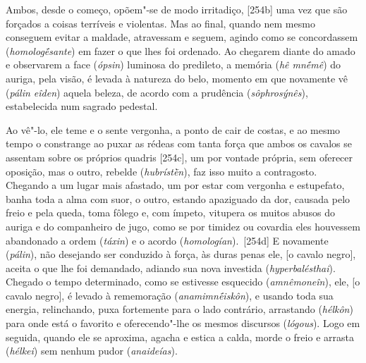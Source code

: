 Ambos, desde o começo, opõem"-se de modo irritadiço, [254b] uma vez
que são forçados a coisas terríveis e violentas. Mas ao final, quando
nem mesmo conseguem evitar a maldade, atravessam e seguem, agindo como
se concordassem (\emph{homologḗsante}) em fazer o que lhes foi ordenado.
Ao chegarem diante do amado e observarem a face (\emph{ópsin}) luminosa
do predileto, a memória (\emph{hê mnḗmê}) do auriga, pela visão, é
levada à natureza do belo, momento em que novamente vê (\emph{pálin
eîden}) aquela beleza, de acordo com a prudência (\emph{sôphrosýnês}),
estabelecida num sagrado pedestal.

Ao vê"-lo, ele teme e o sente vergonha, a ponto de cair de costas, e ao
mesmo tempo o constrange ao puxar as rédeas com tanta força que ambos os
cavalos se assentam sobre os próprios quadris [254c], um por vontade
própria, sem oferecer oposição, mas o outro, rebelde (\emph{hubrístḕn}),
faz isso muito a contragosto. Chegando a um lugar mais afastado, um por
estar com vergonha e estupefato, banha toda a alma com suor, o outro,
estando apaziguado da dor, causada pelo freio e pela queda, toma fôlego
e, com ímpeto, vitupera os muitos abusos do auriga e do companheiro de
jugo, como se por timidez ou covardia eles houvessem abandonado a ordem
(\emph{táxin}) e o acordo (\emph{homologían}).~[254d] E novamente
(\emph{pálin}), não desejando ser conduzido à força, às duras penas ele,
[o cavalo negro], aceita o que lhe foi demandado, adiando sua nova
investida (\emph{hyperbalésthai}). Chegado o tempo determinado, como se
estivesse esquecido (\emph{amnêmoneîn}), ele, [o cavalo negro], é
levado à rememoração (\emph{anamimnḗiskôn}), e usando toda sua energia,
relinchando, puxa fortemente para o lado contrário, arrastando
(\emph{hélkôn}) para onde está o favorito e oferecendo"-lhe os mesmos
discursos (\emph{lógous}). Logo em seguida, quando ele se aproxima,
agacha e estica a calda, morde o freio e arrasta (\emph{hélkei}) sem
nenhum pudor (\emph{anaideías}).

